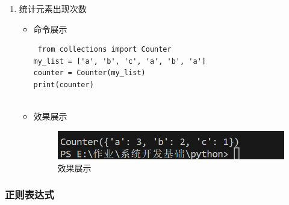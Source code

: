 \documentclass[UTF8]{ctexart}
\begin{document}
\begin{enumerate}
  \item 统计元素出现次数
  \begin{itemize}
  \item 命令展示
  \begin{verbatim}
 from collections import Counter
my_list = ['a', 'b', 'c', 'a', 'b', 'a']
counter = Counter(my_list)
print(counter)
    
  \end{verbatim}

  \item 效果展示
  \begin{figure}[H]
    \centering
    \includegraphics[width=\textwidth]{210} %
    \caption{效果展示}
  
  \end{figure}
\end{itemize}
\end{enumerate}

















\subsubsection{正则表达式}
\end{document}
